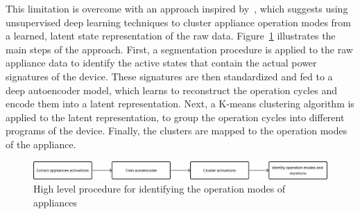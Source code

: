 This limitation is overcome with an approach inspired by~\cite{castangiaClusteringApplianceOperation2023}, which suggests using unsupervised deep learning techniques to cluster appliance operation modes from a learned, latent state representation of the raw data. Figure~\ref{fig:high-level-procedure} illustrates the main steps of the approach. First, a segmentation procedure is applied to the raw appliance data to identify the active states that contain the actual power signatures of the device. These signatures are then standardized and fed to a deep autoencoder model, which learns to reconstruct the operation cycles and encode them into a latent representation. Next, a K-means clustering algorithm is applied to the
latent representation, to group the operation cycles into different programs of the device. Finally, the clusters are mapped to the operation modes of the appliance.

\begin{figure}
    \centering
    \includegraphics[width=.9\linewidth]{images/high_level_procedure.png}
    \caption{High level procedure for identifying the operation modes of appliances}%
    \label{fig:high-level-procedure}
\end{figure}

